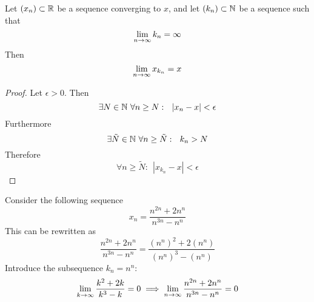 \documentclass[../../script.tex]{subfiles}
\begin{document}
\begin{thm}
Let $(x_n) \subset \mathbb{R}$ be a sequence converging to $x$, and let $(k_n) \subset \mathbb{N}$ be a sequence such that
\[
	\lim_{n \rightarrow \infty} k_n = \infty
\]
Then
\[
	\lim_{n \rightarrow \infty} x_{k_n} = x
\]
\end{thm}
\begin{proof}
Let $\epsilon > 0$. Then
\begin{equation}
	\exists N \in \mathbb{N} ~\forall n \ge N: ~~|x_n - x| < \epsilon
\end{equation}
Furthermore
\begin{equation}
	\exists \tilde{N} \in \mathbb{N} ~\forall n \ge \tilde{N}: ~~k_n > N
\end{equation}
Therefore
\begin{equation}
	\forall n \ge \tilde{N}: ~~|x_{k_n} - x| < \epsilon
\end{equation}
\end{proof}

\begin{eg}
Consider the following sequence
\[
	x_n = \frac{n^{2n} + 2n^n}{n^{3n} - n^n}
\]
This can be rewritten as
\[
	\frac{n^{2n} + 2n^n}{n^{3n} - n^n} = \frac{(n^n)^2 + 2(n^n)}{(n^n)^3 - (n^n)}
\]
Introduce the subsequence $k_n = n^n$:
\[
	\lim_{k \rightarrow \infty}\frac{k^2 + 2k}{k^3 - k} = 0 \implies \lim_{n \rightarrow \infty}\frac{n^{2n} + 2n^n}{n^{3n} - n^n} = 0
\]
\end{eg}
\end{document}
